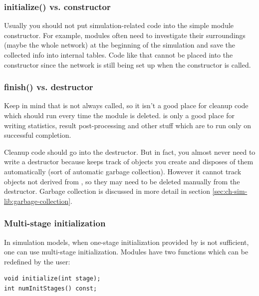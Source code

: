 \subsubsection{initialize() vs. constructor}


Usually you should not put simulation-related code into the
simple module constructor. For
example, modules often need to investigate their surroundings (maybe
the whole network) at the beginning of the simulation and save the
collected info into internal tables.  Code like that cannot be placed
into the constructor since the network is still being set up when the
constructor is called.


\subsubsection{finish() vs. destructor}


Keep in mind that  is not always called, so it isn't a
good place for cleanup code which should run every time the module is
deleted.  is only a good place for writing statistics,
result post-processing and other stuff which are to run only on
successful completion.

Cleanup code should go into the destructor. But in
fact, you almost never need to write a destructor because {\opp}
keeps track of objects you create and disposes of them automatically
(sort of automatic garbage collection). However it cannot track
objects not derived from , so they may
need to be deleted manually from the destructor. Garbage collection
is discussed in more detail in section \ref{sec:ch-sim-lib:garbage-collection}.



\subsubsection{Multi-stage initialization}


In simulation models, when one-stage
initialization provided by 
is not sufficient, one can use multi-stage
initialization.  Modules have two
functions which can be redefined by the user:

\begin{verbatim}
void initialize(int stage);
int numInitStages() const;
\end{verbatim}


